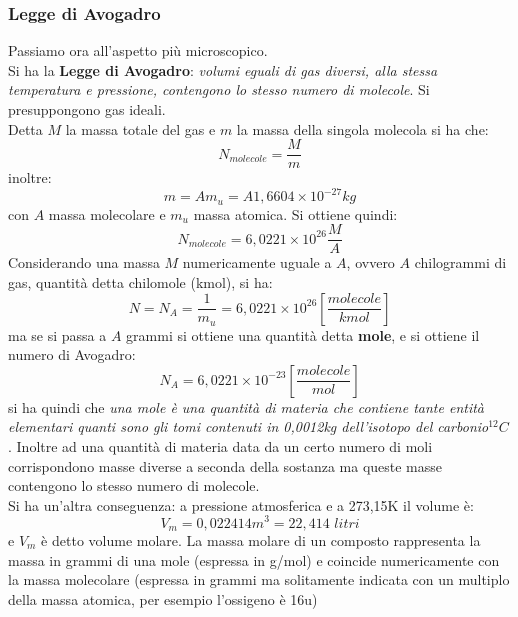 \documentclass[a4paper,12pt, oneside]{book}
\begin{document}
\subsubsection{Legge di Avogadro}
Passiamo ora all'aspetto più microscopico.\\
Si ha la \textbf{Legge di Avogadro}: \textit{volumi eguali di gas diversi, alla stessa temperatura e pressione, contengono lo stesso numero di molecole}. Si presuppongono gas ideali.\\
Detta $M$ la massa totale del gas e $m$ la massa della singola molecola si ha che:
$$N_{molecole}=\frac{M}{m}$$
inoltre:
$$m=Am_u=A1,6604\times 10^{-27}kg$$
con $A$ massa molecolare e $m_u$ massa atomica. Si ottiene quindi:
$$N_{molecole}=6,0221\times 10^{26}\frac{M}{A}$$
Considerando una massa $M$ numericamente uguale a $A$, ovvero $A$ chilogrammi di gas, quantità detta chilomole (kmol), si ha:
$$N=N_A=\frac{1}{m_u}=6,0221\times 10^{26}\left[\frac{molecole}{kmol}\right]$$
ma se si passa a $A$ grammi si ottiene una quantità detta \textbf{mole}, e si ottiene il numero di Avogadro:
$$N_A=6,0221\times 10^{-23}\left[\frac{molecole}{mol}\right]$$
si ha quindi che \textit{una mole è una quantità di materia che contiene tante entità elementari quanti sono gli tomi contenuti in 0,0012kg dell'isotopo del carbonio}$^{12}C$. Inoltre ad una quantità di materia data da un certo numero di moli corrispondono masse diverse a seconda della sostanza ma queste masse contengono lo stesso numero di molecole.\\
Si ha un'altra conseguenza: a pressione atmosferica e a 273,15K il volume è:
$$V_m=0,022414m^3=22,414\,\,litri$$
e $V_m$ è detto volume molare. La massa molare di un composto rappresenta la massa in grammi di una mole (espressa in g/mol) e coincide numericamente con la massa molecolare (espressa in grammi ma solitamente indicata con un multiplo della massa atomica, per esempio l'ossigeno è 16u)
\end{document}
